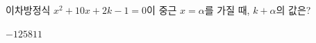 이차방정식 $x^2+10x+2k-1=0$이 중근 $x=\alpha$를 가질 때, $k+\alpha$의 값은? 
\begin{choices32}{$-1$}{$2$}{$5$}{$8$}{$11$}\end{choices32}
